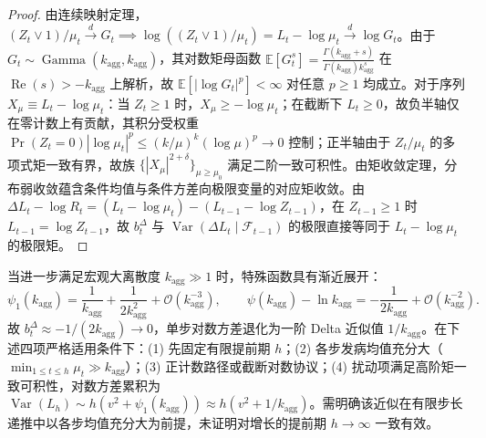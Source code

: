 \documentclass[11pt,a4paper]{article}
\theoremstyle{remark}
\newcommand{\E}{\mathbb{E}}
\newcommand{\Var}{\operatorname{Var}}
\begin{document}
\begin{proof}
由连续映射定理，$(Z_t \vee 1)/\mu_t \xrightarrow{d} G_t \implies \log((Z_t \vee 1)/\mu_t) = L_t - \log\mu_t \xrightarrow{d} \log G_t$。由于 $G_t \sim \operatorname{Gamma}(k_{\text{agg}}, k_{\text{agg}})$，其对数矩母函数 $\E[G_t^s] = \frac{\Gamma(k_{\text{agg}}+s)}{\Gamma(k_{\text{agg}}) k_{\text{agg}}^s}$ 在 $\operatorname{Re}(s) > -k_{\text{agg}}$ 上解析，故 $\E[|\log G_t|^p] < \infty$ 对任意 $p \ge 1$ 均成立。对于序列 $X_{\mu} \equiv L_t - \log\mu_t$：当 $Z_t \ge 1$ 时，$X_\mu \ge -\log\mu_t$；在截断下 $L_t \ge 0$，故负半轴仅在零计数上有贡献，其积分受权重 $\Pr(Z_t=0) |\log\mu_t|^p \le (k/\mu)^k (\log\mu)^p \to 0$ 控制；正半轴由于 $Z_t/\mu_t$ 的多项式矩一致有界，故族 $\{|X_\mu|^{2+\delta}\}_{\mu \ge \mu_0}$ 满足二阶一致可积性。由矩收敛定理，分布弱收敛蕴含条件均值与条件方差向极限变量的对应矩收敛。由 $\Delta L_t - \log R_t = (L_t - \log\mu_t) - (L_{t-1} - \log Z_{t-1})$，在 $Z_{t-1} \ge 1$ 时 $L_{t-1} = \log Z_{t-1}$，故 $b_t^\Delta$ 与 $\Var(\Delta L_t \mid \mathcal{F}_{t-1})$ 的极限直接等同于 $L_t - \log\mu_t$ 的极限矩。
\end{proof}

当进一步满足宏观大离散度 $k_{\text{agg}} \gg 1$ 时，特殊函数具有渐近展开：
\begin{equation}
\psi_1(k_{\text{agg}}) = \frac{1}{k_{\text{agg}}} + \frac{1}{2k_{\text{agg}}^2} + \mathcal{O}(k_{\text{agg}}^{-3}), \qquad \psi(k_{\text{agg}}) - \ln k_{\text{agg}} = -\frac{1}{2k_{\text{agg}}} + \mathcal{O}(k_{\text{agg}}^{-2}).
\end{equation}
故 $b_t^\Delta \approx -1/(2k_{\text{agg}}) \to 0$，单步对数方差退化为一阶 Delta 近似值 $1/k_{\text{agg}}$。在下述四项严格适用条件下：(1) 先固定有限提前期 $h$；(2) 各步发病均值充分大（$\min_{1 \le t \le h} \mu_t \gg k_{\text{agg}}$）；(3) 正计数路径或截断对数协议；(4) 扰动项满足高阶矩一致可积性，对数方差累积为 $\Var(L_h) \sim h(v^2 + \psi_1(k_{\text{agg}})) \approx h(v^2 + 1/k_{\text{agg}})$。需明确该近似在有限步长递推中以各步均值充分大为前提，未证明对增长的提前期 $h \to \infty$ 一致有效。
\end{document}
